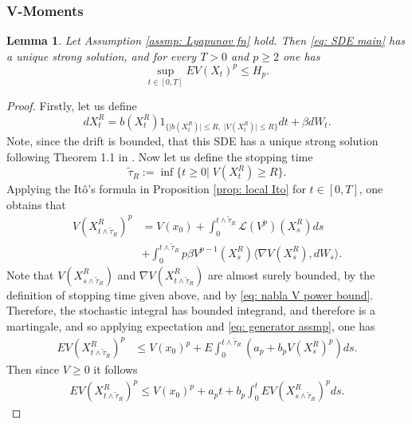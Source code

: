 \documentclass{article}
\newtheorem{lemma}{Lemma}
\begin{document}
\subsubsection{V-Moments}
\begin{lemma}\label{lem: V bounds cont non-uniform}
    Let Assumption \ref{assmp: Lyapunov fn} hold. Then \eqref{eq: SDE main} has a unique strong solution, and for every $T>0$ and $p\geq 2$ one has
    \begin{equation}
\sup_{t\in [0,T]} EV(X_t)^p\leq H_p.
    \end{equation}
\end{lemma}
\begin{proof}
  Firstly, let us define
  \begin{equation}
      dX^R_t=b(X^R_t)1_{\{\lvert b(X^R_t)\rvert \leq R,\;\lvert V(X^R_t)\rvert \leq R\}
      }dt+\beta dW_t.
  \end{equation}
  Note, since the drift is bounded, that this SDE has a unique strong solution following Theorem 1.1 in \cite{ZHANG20051805}. Now let us define the stopping time
   \begin{equation}\label{eq: result of V moment bound cont}
       \tilde{\tau}_R:=\inf\{t\geq 0\vert \; V(X^R_t)\geq R\}.
   \end{equation}
Applying the Itô's formula in Proposition \ref{prop: local Ito} for $t\in [0,T]$, one obtains that
  \begin{align}\label{eq: Ito's formula V}
   V(X^R_{t\wedge \tilde{\tau}_R})^p&=V(x_0)+\int^{t\wedge \tilde{\tau}_R} _0 \mathcal{L}(V^p)(X^R_s) ds\nonumber \\
   &+\int^{t\wedge \tilde{\tau}_R} _0 p\beta V^{p-1}(X^R_s)\langle \nabla V(X^R_s),dW_s\rangle.
  \end{align}  
  Note that $V(X^R_{s\wedge \tilde{\tau}_R})$ and $\nabla V(X^R_{t\wedge \tilde{\tau}_R})$ are almost surely bounded, by the definition of stopping time given above, and by \eqref{eq: nabla V power bound}. Therefore, the stochastic integral has bounded integrand, and therefore is a martingale, and so applying expectation and \eqref{eq: generator assmp}, one has
    \begin{align}
        E V(X^R_{t\wedge \tilde{\tau}_R})^p&\leq V(x_0)^p+E\int^{t\wedge \tilde{\tau}_R}_0 (a_p+b_pV(X^R_s)^p)ds.
    \end{align}
   Then since $V\geq 0$ it follows
        \begin{align}\label{eq: V power p cont}
        E V(X^R_{t\wedge \tilde{\tau}_R})^p\leq V(x_0)^p+a_pt+b_p\int^t_0 EV(X^R_{s\wedge \tilde{\tau}_R})^p ds.

\end{align}
\end{proof}
\end{document}
